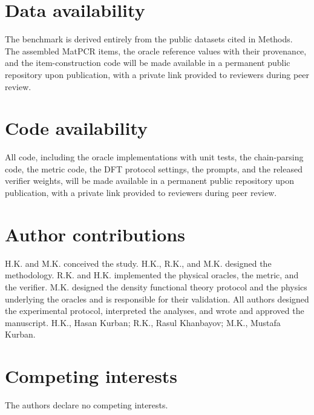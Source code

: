 \documentclass[pdflatex,sn-nature]{sn-jnl}
\begin{document}
\section*{Data availability}
The benchmark is derived entirely from the public datasets cited in
Methods.\cite{opxrd2025,matproj2013} The assembled MatPCR items, the oracle
reference values with their provenance, and the item-construction code will be made
available in a permanent public repository upon publication, with a private link
provided to reviewers during peer review.

\section*{Code availability}
All code, including the oracle implementations with unit tests, the chain-parsing
code, the metric code, the DFT protocol settings, the prompts, and the released
verifier weights, will be made available in a permanent public repository upon
publication, with a private link provided to reviewers during peer review.

\section*{Author contributions}
H.K. and M.K. conceived the study. H.K., R.K., and M.K. designed the methodology.
R.K. and H.K. implemented the physical oracles, the metric, and the verifier. M.K.
designed the density functional theory protocol and the physics underlying the oracles
and is responsible for their validation. All authors designed the experimental protocol,
interpreted the analyses, and wrote and approved the manuscript. H.K., Hasan Kurban; R.K., Rasul
Khanbayov; M.K., Mustafa Kurban.

\section*{Competing interests}
The authors declare no competing interests.
\end{document}
